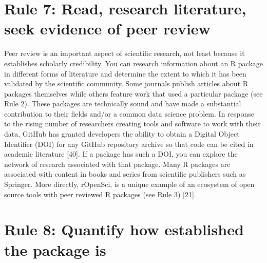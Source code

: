 \documentclass[10pt,letterpaper]{article}
\begin{document}
\hypertarget{rule-7-read-research-literature-seek-evidence-of-peer-review}{%
\section{Rule 7: Read, research literature, seek evidence of peer
review}\label{rule-7-read-research-literature-seek-evidence-of-peer-review}}

Peer review is an important aspect of scientific research, not least
because it establishes scholarly credibility. You can research
information about an R package in different forms of literature and
determine the extent to which it has been validated by the scientific
community. Some journals publish articles about R packages themselves
while others feature work that used a particular package (see Rule 2).
These packages are technically sound and have made a substantial
contribution to their fields and/or a common data science problem. In
response to the rising number of researchers creating tools and software
to work with their data, GitHub has granted developers the ability to
obtain a Digital Object Identifier (DOI) for any GitHub repository
archive so that code can be cited in academic literature {[}40{]}. If a
package has such a DOI, you can explore the network of research
associated with that package. Many R packages are associated with
content in books and series from scientific publishers such as Springer.
More directly, rOpenSci, is a unique example of an ecosystem of open
source tools with peer reviewed R packages (see Rule 3) {[}21{]}.

\hypertarget{rule-8-quantify-how-established-the-package-is}{%
\section{Rule 8: Quantify how established the package
is}\label{rule-8-quantify-how-established-the-package-is}}
\end{document}
